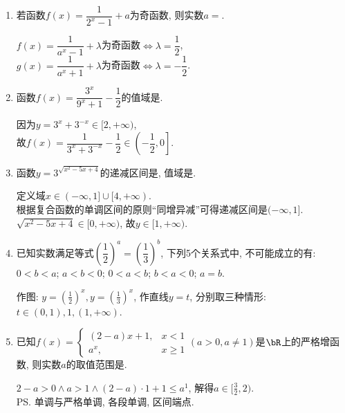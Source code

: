 \begin{enumerate}
\item 若函数$f(x)=\dfrac{1}{2^x-1}+a$为奇函数, 则实数$a=$. 
\begin{jieda}
$f(x)=\dfrac{1}{a^x-1}+\lambda$为奇函数$\iff\lambda=\dfrac{1}{2}$, \\
$g(x)=\dfrac{1}{a^x+1}+\lambda$为奇函数$\iff\lambda=-\dfrac{1}{2}$. 
\end{jieda}


\item 函数$f(x)=\dfrac{3^x}{9^x+1}-\dfrac{1}{2}$的值域是\blkda{$\left(-\dfrac{1}{2},0\right]$}. 
\begin{jieda}
因为$y=3^x+3^{-x}\in[2,+\infty)$, \\
故$f(x)=\dfrac{1}{3^x+3^{-x}}-\dfrac{1}{2}\in\left(-\dfrac{1}{2},0\right]$. 
\end{jieda}

\item 函数$y=3^{\sqrt{x^2-5x+4}}$的递减区间是\blkda{$(-\infty,1]$}, 值域是\blkda{$[1,+\infty)$}. 
\begin{jieda}
定义域$x\in(-\infty,1]\cup[4,+\infty)$. \\
根据复合函数的单调区间的原则``同增异减''可得递减区间是$(-\infty,1]$. \\
$\sqrt{x^2-5x+4}\in[0,+\infty)$, 故$y\in[1,+\infty)$. 
\end{jieda}

\item 已知实数满足等式$\left(\dfrac{1}{2}\right)^a=\left(\dfrac{1}{3}\right)^b$, 下列5个关系式中, 不可能成立的有: \\
 $0<b<a$;  $a<b<0$;  $0<a<b$;  $b<a<0$;  $a=b$. 
\begin{jieda}
作图: $y=(\frac{1}{2})^x, y=(\frac{1}{3})^x$, 作直线$y=t$, 分别取三种情形: $t\in(0,1),1,(1,+\infty)$. 
\end{jieda}

\item 已知$f(x)=\begin{cases}
(2-a)x+1, & x<1\\
a^x, & x\geq 1
\end{cases}(a>0, a\neq1)$是$\bR$上的严格增函数, 则实数$a$的取值范围是\blkda{$[\frac{3}{2},2)$}. 
\begin{jieda}
$2-a >  0\land a>1\land (2-a)\cdot 1+1\leq a^1$, 解得$a\in[\frac{3}{2},2)$. \\
\ps 单调与严格单调, 各段单调, 区间端点. 
\end{jieda}


\end{enumerate}
